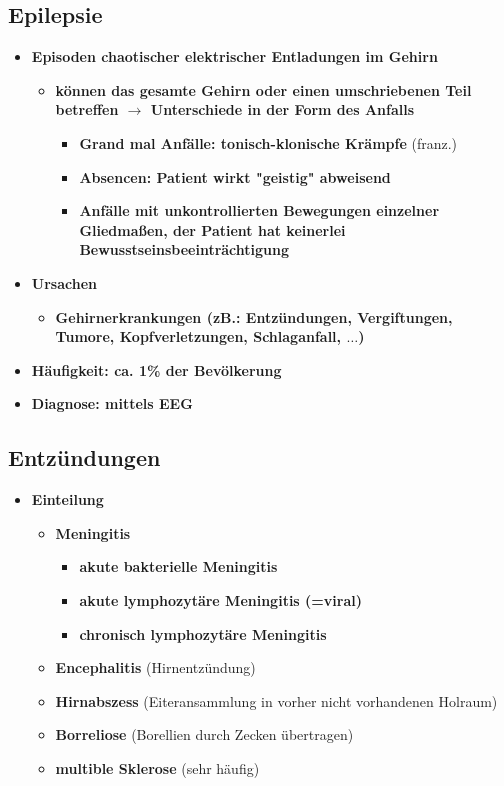 \subsection{Epilepsie}
	\begin{itemize}
		\item \textbf{Episoden chaotischer elektrischer Entladungen im Gehirn}
			\begin{itemize}
				\item \textbf{können das gesamte Gehirn oder einen umschriebenen Teil betreffen $\rightarrow$ Unterschiede in der Form des Anfalls}
					\begin{itemize}
						\item \textbf{Grand mal Anfälle: tonisch-klonische Krämpfe} (franz.)
						\item \textbf{Absencen: Patient wirkt "geistig" abweisend}
						\item \textbf{Anfälle mit unkontrollierten Bewegungen einzelner Gliedmaßen, der Patient hat keinerlei Bewusstseinsbeeinträchtigung}
					\end{itemize}
			\end{itemize}
		\item \textbf{Ursachen}
			\begin{itemize}
				\item \textbf{Gehirnerkrankungen (zB.: Entzündungen, Vergiftungen, Tumore, Kopfverletzungen, Schlaganfall, $\dots$)}
			\end{itemize}
		\item \textbf{Häufigkeit: ca. 1\% der Bevölkerung}
		\item \textbf{Diagnose: mittels EEG}
	\end{itemize}
	
\subsection{Entzündungen}
	\begin{itemize}
		\item \textbf{Einteilung}
			\begin{itemize}
				\item \textbf{Meningitis}
					\begin{itemize}
						\item \textbf{akute bakterielle Meningitis}
						\item \textbf{akute lymphozytäre Meningitis (=viral)}
						\item \textbf{chronisch lymphozytäre Meningitis}
					\end{itemize}
				\item \textbf{Encephalitis} (Hirnentzündung)
				\item \textbf{Hirnabszess} (Eiteransammlung in vorher nicht vorhandenen Holraum)
				\item \textbf{Borreliose} (Borellien durch Zecken übertragen)
				\item \textbf{multible Sklerose} (sehr häufig)
			\end{itemize}
	\end{itemize}
	
